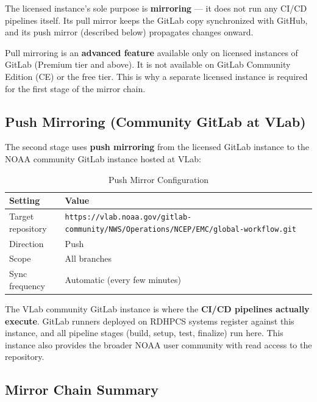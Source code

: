 \documentclass[11pt,letterpaper,twoside]{article}
\begin{document}
The licensed instance's sole purpose is \textbf{mirroring} --- it does not run
any CI/CD pipelines itself. Its pull mirror keeps the GitLab copy synchronized
with GitHub, and its push mirror (described below) propagates changes onward.

\begin{notebox}
Pull mirroring is an \textbf{advanced feature} available only on licensed
instances of GitLab (Premium tier and above). It is not available on GitLab
Community Edition (CE) or the free tier. This is why a separate licensed
instance is required for the first stage of the mirror chain.
\end{notebox}

\subsection{Push Mirroring (Community GitLab at VLab)}
\label{sec:push-mirror}

The second stage uses \textbf{push mirroring} from the licensed GitLab instance
to the NOAA community GitLab instance hosted at VLab:

\begin{table}[H]
\centering
\caption{Push Mirror Configuration}
\label{tab:push-mirror}
\begin{tabularx}{\linewidth}{lX}
\toprule
\textbf{Setting} & \textbf{Value} \\
\midrule
Target repository & {\small\texttt{https://vlab.noaa.gov/gitlab-community/\allowbreak NWS/Operations/NCEP/EMC/\allowbreak global-workflow.git}} \\
Direction & Push \\
Scope & All branches \\
Sync frequency & Automatic (every few minutes) \\
\bottomrule
\end{tabularx}
\end{table}

The VLab community GitLab instance is where the \textbf{CI/CD pipelines
actually execute}. GitLab runners deployed on RDHPCS systems register against
this instance, and all pipeline stages (build, setup, test, finalize) run here.
This instance also provides the broader NOAA user community with read access to
the repository.

\subsection{Mirror Chain Summary}
\label{sec:mirror-summary}
\end{document}
